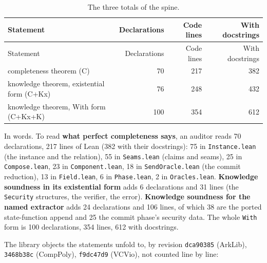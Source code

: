 {\footnotesize
\begin{longtable}{@{}lrrr@{}}
\caption{The three totals of the spine.}\label{tab:gen-surface-spine-totals}\\
\toprule
Statement & Declarations & Code lines & With docstrings \\
\midrule
\endfirsthead
\toprule
Statement & Declarations & Code lines & With docstrings \\
\midrule
\endhead
\bottomrule
\endfoot
completeness theorem (C) & 70 & 217 & 382 \\
knowledge theorem, existential form (C+Kx) & 76 & 248 & 432 \\
knowledge theorem, With form (C+Kx+K) & 100 & 354 & 612 \\
\end{longtable}}

In words. To read \textbf{what perfect completeness says}, an auditor reads 70 declarations, 217 lines of Lean (382 with their docstrings): 75 in \texttt{Instance.\allowbreak{}lean} (the instance and the relation), 55 in \texttt{Seams.\allowbreak{}lean} (claims and seams), 25 in \texttt{Compose.\allowbreak{}lean}, 23 in \texttt{Component.\allowbreak{}lean}, 18 in \texttt{SendOracle.\allowbreak{}lean} (the commit reduction), 13 in \texttt{Field.\allowbreak{}lean}, 6 in \texttt{Phase.\allowbreak{}lean}, 2 in \texttt{Oracles.\allowbreak{}lean}. \textbf{Knowledge soundness in its existential form} adds 6 declarations and 31 lines (the \texttt{Security} structures, the verifier, the error). \textbf{Knowledge soundness for the named extractor} adds 24 declarations and 106 lines, of which 38 are the ported state-function append and 25 the commit phase's security data. The whole \texttt{With} form is 100 declarations, 354 lines, 612 with docstrings.

The library objects the statements unfold to, by revision \texttt{dca90385} (ArkLib), \texttt{3468b38c} (CompPoly), \texttt{f9dc47d9} (VCVio), not counted line by line:

